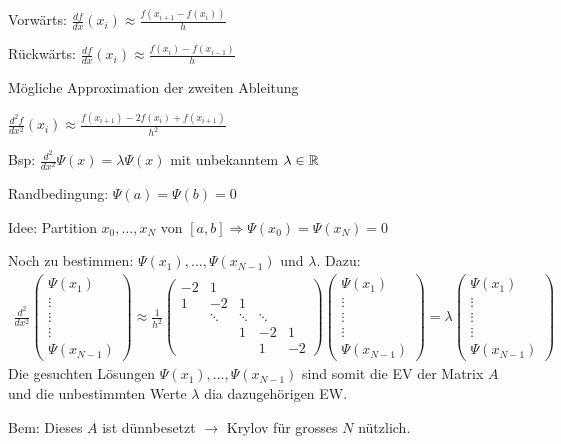 Vorwärts: $\frac{df}{dx} (x_i) \approx \frac{f(x_{i+1} - f(x_i))}{h}$

Rückwärts: $\frac{df}{dx} (x_i) \approx \frac{f(x_i) - f(x_{i-1})}{h}$

Mögliche Approximation der zweiten Ableitung

$\frac{d^2 f}{dx^2} (x_i) \approx \frac{f(x_{i+1}) - 2 f(x_i) + f(x_{i+1})}{h^2}$

\vspace{1\baselineskip}

Bsp: $\frac{d^2}{dx^2} \Psi(x) = \lambda \Psi(x)$ mit unbekanntem $\lambda \in \mathbb{R}$

Randbedingung: $\Psi(a) = \Psi(b) = 0$

Idee: Partition $x_0,\dots,x_N$ von $[a,b] \Rightarrow \Psi(x_0) = \Psi(x_N) = 0$

Noch zu bestimmen: $\Psi(x_1),\dots,\Psi(x_{N-1})$ und $\lambda$. Dazu:
\begin{align*}
    \frac{d^2}{dx^2} \begin{pmatrix}
        \Psi(x_1) \\ \vdots \\ \vdots \\ \vdots \\ \Psi(x_{N-1})
    \end{pmatrix}
    \approx \frac{1}{h^2} \begin{pmatrix}
        -2 & 1 & & & \\
        1 & -2 & 1 & & \\
        & \ddots & \ddots & \ddots & \\
        & & 1 & -2 & 1 \\
        & & & 1 & -2
    \end{pmatrix} \begin{pmatrix}
        \Psi(x_1) \\ \vdots \\ \vdots \\ \vdots \\ \Psi(x_{N-1})
    \end{pmatrix}
    = \lambda \begin{pmatrix}
        \Psi(x_1) \\ \vdots \\ \vdots \\ \vdots \\ \Psi(x_{N-1})
    \end{pmatrix}
\end{align*}
Die gesuchten Lösungen $\Psi(x_1),\dots,\Psi(x_{N-1})$ sind somit die EV der Matrix
$A$ und die unbestimmten Werte $\lambda$ dia dazugehörigen EW.

Bem: Dieses $A$ ist dünnbesetzt $\rightarrow$ Krylov für grosses $N$ nützlich.





